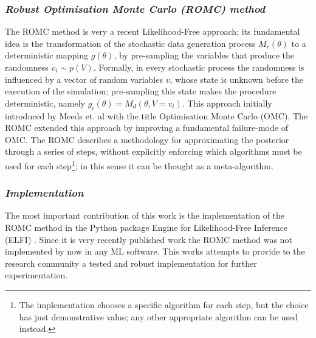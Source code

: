 \subsubsection*{\textit{Robust Optimisation Monte Carlo (ROMC) method}}

The ROMC method \cite{Ikonomov2019} is very a recent Likelihood-Free
approach; its fundamental idea is the transformation of the stochastic
data generation process $M_r(\theta)$ to a deterministic mapping
$g(\theta)$, by pre-sampling the variables that produce the randomness
$v_i \sim p(V)$. Formally, in every stochastic process the randomness
is influenced by a vector of random variables $v$, whose state is
unknown before the execution of the simulation; pre-sampling this
state makes the procedure deterministic, namely
$g_i(\theta) = M_d(\theta, V=v_i)$. This approach initially introduced
by Meeds et. al \cite{Meeds2015} with the title Optimisation Monte
Carlo (OMC). The ROMC extended this approach by improving a
fundamental failure-mode of OMC. The ROMC describes a methodology for
approximating the posterior through a series of steps, without
explicitly enforcing which algorithms must be used for each
step\footnote{The implementation chooses a specific algorithm for each
  step, but the choice has just demonstrative value; any other
  appropriate algorithm can be used instead.}; in this sense it can be
thought as a meta-algorithm.

\subsubsection*{\textit{Implementation}}

The most important contribution of this work is the implementation of
the ROMC method in the Python package Engine for Likelihood-Free
Inference (ELFI) \cite{1708.00707}. Since it is very recently
published work the ROMC method was not implemented by now in any ML
software. This works attempts to provide to the research community a
tested and robust implementation for further experimentation.
